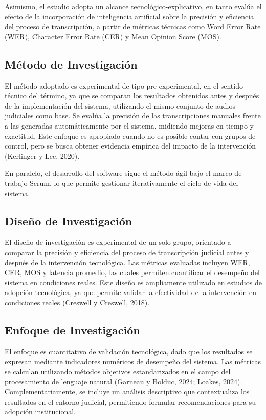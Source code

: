 \documentclass[12pt,a4paper,oneside]{report}
\begin{document}
Asimismo, el estudio adopta un alcance tecnológico-explicativo, en tanto evalúa el efecto de la incorporación de inteligencia artificial sobre la precisión y eficiencia del proceso de transcripción, a partir de métricas técnicas como Word Error Rate (WER), Character Error Rate (CER) y Mean Opinion Score (MOS).

\subsection{Método de Investigación}

El método adoptado es experimental de tipo pre-experimental, en el sentido técnico del término, ya que se comparan los resultados obtenidos antes y después de la implementación del sistema, utilizando el mismo conjunto de audios judiciales como base. Se evalúa la precisión de las transcripciones manuales frente a las generadas automáticamente por el sistema, midiendo mejoras en tiempo y exactitud. Este enfoque es apropiado cuando no es posible contar con grupos de control, pero se busca obtener evidencia empírica del impacto de la intervención (Kerlinger y Lee, 2020).

En paralelo, el desarrollo del software sigue el método ágil bajo el marco de trabajo Scrum, lo que permite gestionar iterativamente el ciclo de vida del sistema.

\subsection{Diseño de Investigación}

El diseño de investigación es experimental de un solo grupo, orientado a comparar la precisión y eficiencia del proceso de transcripción judicial antes y después de la intervención tecnológica. Las métricas evaluadas incluyen WER, CER, MOS y latencia promedio, las cuales permiten cuantificar el desempeño del sistema en condiciones reales. Este diseño es ampliamente utilizado en estudios de adopción tecnológica, ya que permite validar la efectividad de la intervención en condiciones reales (Creswell y Creswell, 2018).

\subsection{Enfoque de Investigación}

El enfoque es cuantitativo de validación tecnológica, dado que los resultados se expresan mediante indicadores numéricos de desempeño del sistema. Las métricas se calculan utilizando métodos objetivos estandarizados en el campo del procesamiento de lenguaje natural (Garneau y Bolduc, 2024; Loakes, 2024). Complementariamente, se incluye un análisis descriptivo que contextualiza los resultados en el entorno judicial, permitiendo formular recomendaciones para su adopción institucional.
\end{document}
